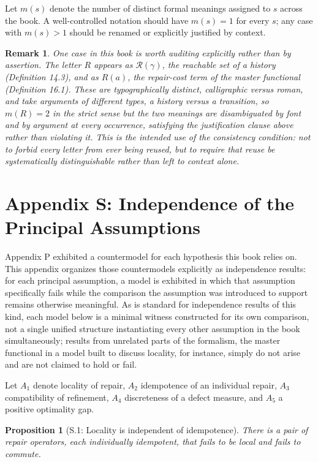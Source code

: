 \documentclass[11pt]{book}
\newtheorem*{appendixproposition}{Proposition}
\newtheorem*{appendixremark}{Remark}
\begin{document}
Let $m(s)$ denote the number of distinct formal meanings assigned to $s$ across the book. A well-controlled notation should have $m(s) = 1$ for every $s$; any case with $m(s) > 1$ should be renamed or explicitly justified by context.

\begin{appendixremark}
One case in this book is worth auditing explicitly rather than by assertion. The letter $R$ appears as $\mathcal R(\gamma)$, the reachable set of a history (Definition 14.3), and as $R(a)$, the repair-cost term of the master functional (Definition 16.1). These are typographically distinct, calligraphic versus roman, and take arguments of different types, a history versus a transition, so $m(R) = 2$ in the strict sense but the two meanings are disambiguated by font and by argument at every occurrence, satisfying the justification clause above rather than violating it. This is the intended use of the consistency condition: not to forbid every letter from ever being reused, but to require that reuse be systematically distinguishable rather than left to context alone.
\end{appendixremark}


\chapter*{Appendix S: Independence of the Principal Assumptions}

Appendix P exhibited a countermodel for each hypothesis this book relies on. This appendix organizes those countermodels explicitly as independence results: for each principal assumption, a model is exhibited in which that assumption specifically fails while the comparison the assumption was introduced to support remains otherwise meaningful. As is standard for independence results of this kind, each model below is a minimal witness constructed for its own comparison, not a single unified structure instantiating every other assumption in the book simultaneously; results from unrelated parts of the formalism, the master functional in a model built to discuss locality, for instance, simply do not arise and are not claimed to hold or fail.

Let $A_1$ denote locality of repair, $A_2$ idempotence of an individual repair, $A_3$ compatibility of refinement, $A_4$ discreteness of a defect measure, and $A_5$ a positive optimality gap.

\begin{appendixproposition}[S.1: Locality is independent of idempotence]
There is a pair of repair operators, each individually idempotent, that fails to be local and fails to commute.
\end{appendixproposition}
\end{document}

